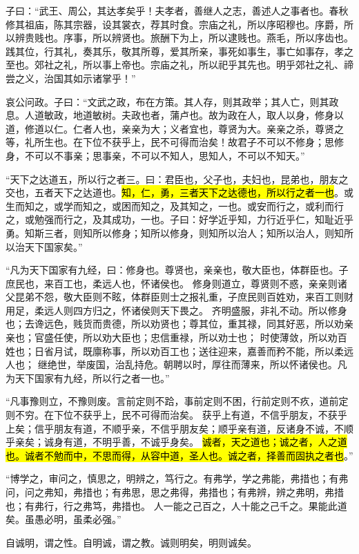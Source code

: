 子曰：“武王、周公，其达孝矣乎！夫孝者，善继人之志，善述人之事者也。春秋修其祖庙，陈其宗器，设其裳衣，荐其时食。宗庙之礼，所以序昭穆也。序爵，所以辨贵贱也。序事，所以辨贤也。旅酬下为上，所以逮贱也。燕毛，所以序齿也。践其位，行其礼，奏其乐，敬其所尊，爱其所亲，事死如事生，事亡如事存，孝之至也。郊社之礼，所以事上帝也。宗庙之礼，所以祀乎其先也。明乎郊社之礼、禘尝之义，治国其如示诸掌乎！”

哀公问政。子曰：“文武之政，布在方策。其人存，则其政举；其人亡，则其政息。人道敏政，地道敏树。夫政也者，蒲卢也。故为政在人，取人以身，修身以道，修道以仁。仁者人也，亲亲为大；义者宜也，尊贤为大。亲亲之杀，尊贤之等，礼所生也。在下位不获乎上，民不可得而治矣！故君子不可以不修身；思修身，不可以不事亲；思事亲，不可以不知人，思知人，不可以不知天。”

“天下之达道五，所以行之者三。曰：君臣也，父子也，夫妇也，昆弟也，朋友之交也，五者天下之达道也。\hl{知，仁，勇，三者天下之达德也，所以行之者一也}。或生而知之，或学而知之，或困而知之，及其知之，一也。或安而行之，或利而行之，或勉强而行之，及其成功，一也。子曰：好学近乎知，力行近乎仁，知耻近乎勇。知斯三者，则知所以修身；知所以修身，则知所以治人；知所以治人，则知所以治天下国家矣。”

“凡为天下国家有九经，曰：修身也。尊贤也，亲亲也，敬大臣也，体群臣也。子庶民也，来百工也，柔远人也，怀诸侯也。
修身则道立，尊贤则不惑，亲亲则诸父昆弟不怨，敬大臣则不眩，体群臣则士之报礼重，子庶民则百姓劝，来百工则财用足，柔远人则四方归之，怀诸侯则天下畏之。
齐明盛服，非礼不动。所以修身也；去谗远色，贱货而贵德，所以劝贤也；尊其位，重其禄，同其好恶，所以劝亲亲也；官盛任使，所以劝大臣也；忠信重禄，所以劝士也；
时使薄敛，所以劝百姓也；日省月试，既廪称事，所以劝百工也；送往迎来，嘉善而矜不能，所以柔远人也；
继绝世，举废国，治乱持危。朝聘以时，厚往而薄来，所以怀诸侯也。凡为天下国家有九经，所以行之者一也。”

“凡事豫则立，不豫则废。言前定则不跲，事前定则不困，行前定则不疚，道前定则不穷。在下位不获乎上，民不可得而治矣。
获乎上有道，不信乎朋友，不获乎上矣；信乎朋友有道，不顺乎亲，不信乎朋友矣；顺乎亲有道，反诸身不诚，不顺乎亲矣；诚身有道，不明乎善，不诚乎身矣。
\hl{诚者，天之道也；诚之者，人之道也。诚者不勉而中，不思而得，从容中道，圣人也。诚之者，择善而固执之者也}。”

“博学之，审问之，慎思之，明辨之，笃行之。有弗学，学之弗能，弗措也；有弗问，问之弗知，弗措也；有弗思，思之弗得，弗措也；有弗辨，辨之弗明，弗措也；有弗行，行之弗笃，弗措也。
人一能之己百之，人十能之己千之。果能此道矣。虽愚必明，虽柔必强。”

自诚明，谓之性。自明诚，谓之教。诚则明矣，明则诚矣。

